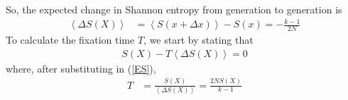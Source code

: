 \documentclass[12pt]{extarticle}
\newcommand{\<}{\langle}
\renewcommand{\>}{\rangle}
\theoremstyle{definition}
\begin{document}
\noindent So, the expected change in Shannon entropy from generation to generation is
\begin{align}
    \left< \Delta S(X) \right> &= \left< S(x + \Delta x) \right> - S(x) = -\frac{k - 1}{2N} \label{ES}
\end{align}
To calculate the fixation time $T$, we start by stating that
\begin{align}
    S(X) - T \left< \Delta S(X) \right> = 0 \nonumber
\end{align}
where, after substituting in (\ref{ES}),
\begin{align}
    T &= \frac{S(X)}{\left< \Delta S(X) \right>} = \frac{2NS(X)}{k - 1} \nonumber
\end{align}
\end{document}
